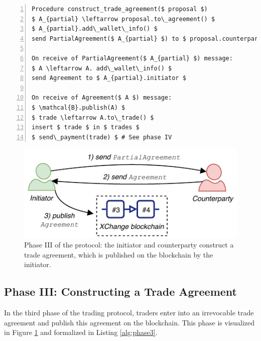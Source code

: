 \begin{lstlisting}[firstnumber=1,caption={Phase III: Constructing a trade agreement between an initiator and a counterparty.},label={alg:phase3},captionpos=b,float=t,numbers=left,tabsize=2, basicstyle=\footnotesize\ttfamily, mathescape=true, emph={while, if, then, do, Procedure, record, send, receive, in, foreach, ignore, else},emphstyle=\bf, frame=TB]
Procedure construct_trade_agreement($ proposal $)
$ A_{partial} \leftarrow proposal.to\_agreement() $
$ A_{partial}.add\_wallet\_info() $
send PartialAgreement($ A_{partial} $) to $ proposal.counterparty $

On receive of PartialAgreement($ A_{partial} $) message:
$ A \leftarrow A. add\_wallet\_info() $
send Agreement to $ A_{partial}.initiator $

On receive of Agreement($ A $) message:
$ \mathcal{B}.publish(A) $
$ trade \leftarrow A.to\_trade() $
insert $ trade $ in $ trades $
$ send\_payment(trade) $ # See phase IV
\end{lstlisting}

\begin{figure}[h]
	\centering
	\includegraphics[width=0.6\linewidth]{xchange/assets/xchange_protocol_3}
	\caption{Phase III of the \ModelName{} protocol: the initiator and counterparty construct a trade agreement, which is published on the \ModelName{} blockchain by the initiator.}
	\label{fig:matching_protocol_3}
\end{figure}

\subsection{Phase III: Constructing a Trade Agreement} \label{sec:phase_agreement}

In the third phase of the trading protocol, traders enter into an irrevocable trade agreement and publish this agreement on the \ModelName{} blockchain.
This phase is visualized in Figure \ref{fig:matching_protocol_3} and formalized in Listing \ref{alg:phase3}.

